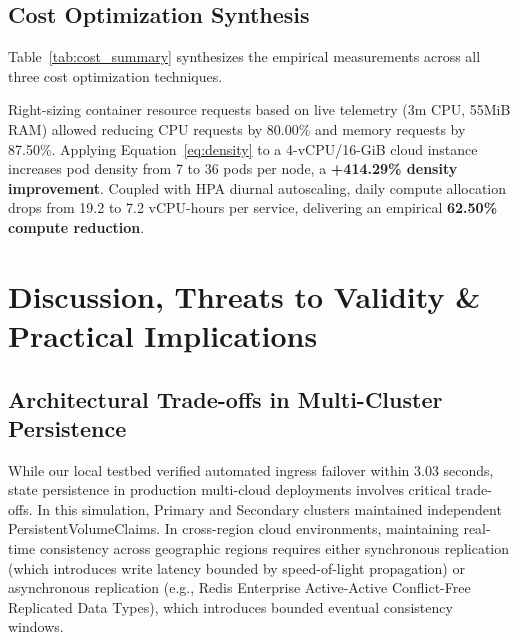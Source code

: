 \documentclass[conference]{IEEEtran}
\begin{document}
\subsection{Cost Optimization Synthesis}
Table~\ref{tab:cost_summary} synthesizes the empirical measurements across all three cost optimization techniques.

\begin{table}[htbp]
\centering
\caption{Comprehensive Cost Optimization Results}
\label{tab:cost_summary}
\end{table}

Right-sizing container resource requests based on live telemetry (3m CPU, 55MiB RAM) allowed reducing CPU requests by 80.00\% and memory requests by 87.50\%. Applying Equation~\ref{eq:density} to a 4-vCPU/16-GiB cloud instance increases pod density from 7 to 36 pods per node, a \textbf{+414.29\% density improvement}. Coupled with HPA diurnal autoscaling, daily compute allocation drops from 19.2 to 7.2 vCPU-hours per service, delivering an empirical \textbf{62.50\% compute reduction}.

\section{Discussion, Threats to Validity \& Practical Implications}

\subsection{Architectural Trade-offs in Multi-Cluster Persistence}
While our local testbed verified automated ingress failover within 3.03 seconds, state persistence in production multi-cloud deployments involves critical trade-offs. In this simulation, Primary and Secondary clusters maintained independent PersistentVolumeClaims. In cross-region cloud environments, maintaining real-time consistency across geographic regions requires either synchronous replication (which introduces write latency bounded by speed-of-light propagation) or asynchronous replication (e.g., Redis Enterprise Active-Active Conflict-Free Replicated Data Types), which introduces bounded eventual consistency windows.
\end{document}
